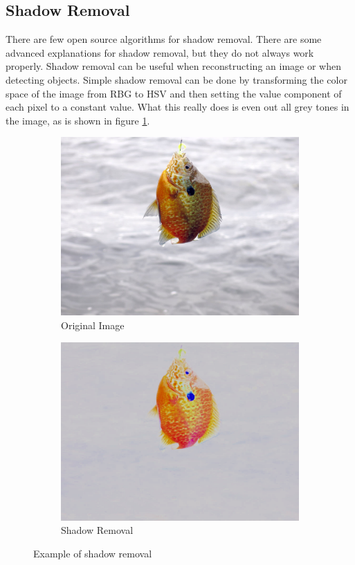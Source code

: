 \subsection{Shadow Removal}
There are few open source algorithms for shadow removal. There are some advanced explanations for shadow removal, but they do not always work properly. Shadow removal can be useful when reconstructing an image or when detecting objects. 
Simple shadow removal can be done by transforming the color space of the image from RBG to HSV and then setting the value component of each pixel to a constant value. What this really does is even out all grey tones in the image, as is shown in figure \ref{fig:shadow_removal}.

\begin{figure}[h]
    \centering
    \begin{subfigure}{0.5\textwidth}
        \centering
        \includegraphics[width=.9\linewidth]{images/literature/colorfish}
        \caption{Original Image}
    \end{subfigure}%
    \begin{subfigure}{.5\textwidth}
        \centering
        \includegraphics[width=.9\linewidth]{images/literature/shadow_removal}
        \caption{Shadow Removal}
    \end{subfigure}
    \caption{Example of shadow removal}
    \label{fig:shadow_removal}
\end{figure}

